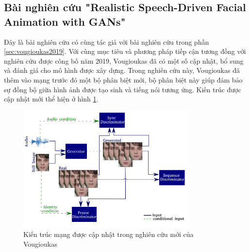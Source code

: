 
\subsection{\texorpdfstring{Bài nghiên cứu "Realistic Speech-Driven Facial Animation with GANs"\cite{vougioukas2020}}{Target}}

Đây là bài nghiên cứu có cùng tác giả với bài nghiên cứu trong phần \ref{sec:vougioukas2019}. Với cùng mục tiêu và phương pháp tiếp cận tương đồng với nghiên cứu được công bố  năm 2019, Vougioukas đã có một số cập nhật, bổ sung và đánh giá cho mô hình được xây dựng. Trong nghiên cứu này, Vougioukas đã thêm vào mạng trước đó một bộ phân biệt mới, bộ phân biệt này giúp đảm bảo sự đồng bộ giữa hình ảnh được tạo sinh và tiếng nói tương ứng. Kiến trúc được cập nhật mới thể hiện ở hình \ref{fig:vou2020_model}.

\begin{figure}[H]
    \centering
    \includegraphics[width=9cm]{./content/images/vou2020_model.png}
    \caption{Kiến trúc mạng được cập nhật trong nghiên cứu mới của Vougioukas}
    \label{fig:vou2020_model}
\end{figure}

